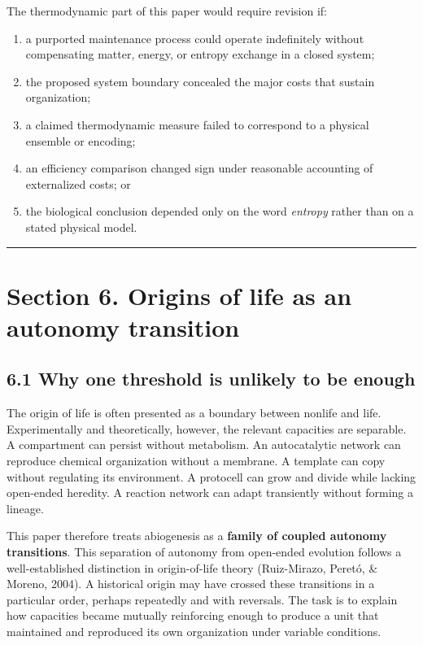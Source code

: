 \documentclass[
  11pt,
]{article}
\providecommand{\tightlist}{%
  \setlength{\itemsep}{0pt}\setlength{\parskip}{0pt}}
\begin{document}
The thermodynamic part of this paper would require revision if:

\begin{enumerate}
\def\labelenumi{\arabic{enumi}.}
\tightlist
\item
  a purported maintenance process could operate indefinitely without
  compensating matter, energy, or entropy exchange in a closed system;
\item
  the proposed system boundary concealed the major costs that sustain
  organization;
\item
  a claimed thermodynamic measure failed to correspond to a physical
  ensemble or encoding;
\item
  an efficiency comparison changed sign under reasonable accounting of
  externalized costs; or
\item
  the biological conclusion depended only on the word \emph{entropy}
  rather than on a stated physical model.
\end{enumerate}

\begin{center}\rule{0.5\linewidth}{0.5pt}\end{center}

\section{Section 6. Origins of life as an autonomy
transition}\label{section-6.-origins-of-life-as-an-autonomy-transition}

\subsection{6.1 Why one threshold is unlikely to be
enough}\label{why-one-threshold-is-unlikely-to-be-enough}

The origin of life is often presented as a boundary between nonlife and
life. Experimentally and theoretically, however, the relevant capacities
are separable. A compartment can persist without metabolism. An
autocatalytic network can reproduce chemical organization without a
membrane. A template can copy without regulating its environment. A
protocell can grow and divide while lacking open-ended heredity. A
reaction network can adapt transiently without forming a lineage.

This paper therefore treats abiogenesis as a \textbf{family of coupled
autonomy transitions}. This separation of autonomy from open-ended
evolution follows a well-established distinction in origin-of-life
theory (Ruiz-Mirazo, Peretó, \& Moreno, 2004). A historical origin may
have crossed these transitions in a particular order, perhaps repeatedly
and with reversals. The task is to explain how capacities became
mutually reinforcing enough to produce a unit that maintained and
reproduced its own organization under variable conditions.
\end{document}
